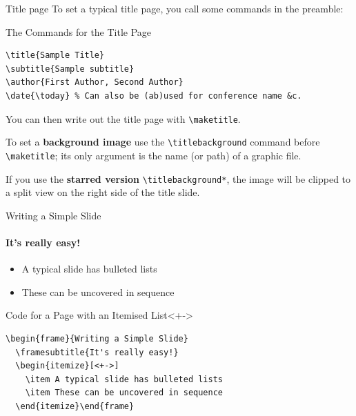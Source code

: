 \begin{frame}[fragile]{Title page}
To set a typical title page, you call some commands in the preamble:
\begin{block}{The Commands for the Title Page}
\begin{verbatim}
\title{Sample Title}
\subtitle{Sample subtitle}
\author{First Author, Second Author}
\date{\today} % Can also be (ab)used for conference name &c.
\end{verbatim}
\end{block}
You can then write out the title page with \verb|\maketitle|.

To set a \textbf{background image} use the \verb|\titlebackground| command 
before \verb|\maketitle|; its only argument is the name (or path) of a graphic 
file.

If you use the \textbf{starred version} \verb|\titlebackground*|, the image 
will be clipped to a split view on the right side of the title slide.

\end{frame}

\begin{frame}[fragile]{Writing a Simple Slide}
\framesubtitle{It's really easy!}
\begin{itemize}[<+->]
\item A typical slide has bulleted lists
\item These can be uncovered in sequence
\end{itemize}
\begin{block}{Code for a Page with an Itemised List}<+->
\begin{verbatim}
\begin{frame}{Writing a Simple Slide}
  \framesubtitle{It's really easy!}
  \begin{itemize}[<+->]
    \item A typical slide has bulleted lists
    \item These can be uncovered in sequence
  \end{itemize}\end{frame}
\end{verbatim}
\end{block}
\end{frame}